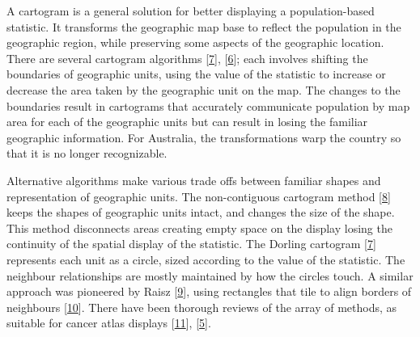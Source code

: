 \documentclass[conference,final,]{IEEEtran}
\begin{document}
A cartogram is a general solution for better displaying a population-based statistic. It transforms the geographic map base to reflect the population in the geographic region, while preserving some aspects of the geographic location. There are several cartogram algorithms {[}\protect\hyperlink{ref-ACTUC}{7}{]}, {[}\protect\hyperlink{ref-CBATCC}{6}{]}; each involves shifting the boundaries of geographic units, using the value of the statistic to increase or decrease the area taken by the geographic unit on the map. The changes to the boundaries result in cartograms that accurately communicate population by map area for each of the geographic units but can result in losing the familiar geographic information. For Australia, the transformations warp the country so that it is no longer recognizable.

Alternative algorithms make various trade offs between familiar shapes and representation of geographic units. The non-contiguous cartogram method {[}\protect\hyperlink{ref-NAC}{8}{]} keeps the shapes of geographic units intact, and changes the size of the shape. This method disconnects areas creating empty space on the display losing the continuity of the spatial display of the statistic. The Dorling cartogram {[}\protect\hyperlink{ref-ACTUC}{7}{]} represents each unit as a circle, sized according to the value of the statistic. The neighbour relationships are mostly maintained by how the circles touch. A similar approach was pioneered by Raisz {[}\protect\hyperlink{ref-RSCW}{9}{]}, using rectangles that tile to align borders of neighbours {[}\protect\hyperlink{ref-CDWCS}{10}{]}. There have been thorough reviews of the array of methods, as suitable for cancer atlas displays {[}\protect\hyperlink{ref-review}{11}{]}, {[}\protect\hyperlink{ref-BCM}{5}{]}.
\end{document}
